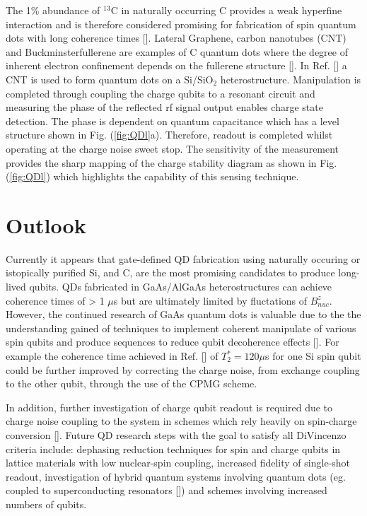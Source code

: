 The 1\% abundance of $^{13}$C in naturally occurring C provides a weak hyperfine interaction and is therefore considered promising for fabrication of spin quantum dots with long coherence times []. Lateral Graphene, carbon nanotubes (CNT) and Buckminsterfullerene are examples of C quantum dots where the degree of inherent electron confinement depends on the fullerene structure []. In Ref. [] a CNT is used to form quantum dots on a Si/SiO$_{2}$ heterostructure. Manipulation is completed through coupling the charge qubits to a resonant circuit and measuring the phase of the reflected rf signal output enables charge state detection. The phase is dependent on quantum capacitance which has a level structure shown in Fig. (\ref{fig:QDl}a). Therefore, readout is completed whilst operating at the charge noise sweet stop. The sensitivity of the measurement provides the sharp mapping of the charge stability diagram as shown in Fig. (\ref{fig:QDl}) which highlights the capability of this sensing technique.   



\section{Outlook}
Currently it appears that gate-defined QD fabrication using naturally occuring or istopically purified Si, and C, are the most promising candidates to produce long-lived qubits. QDs fabricated in GaAs/AlGaAs heterostructures can achieve coherence times of > 1 $\mu$s but are ultimately limited by fluctations of $B^{z}_{nuc}$. However, the continued research of GaAs quantum dots is valuable due to the the understanding gained of techniques to implement coherent manipulate of various spin qubits and produce sequences to reduce qubit decoherence effects []. For example the coherence time achieved in Ref. [] of $T_2^{*} =120 \mu$s for one Si spin qubit could be further improved by correcting the charge noise, from exchange coupling to the other qubit, through the use of the CPMG scheme. 

In addition, further investigation of charge qubit readout is required due to charge noise coupling to the system in schemes which rely heavily on spin-charge conversion []. Future QD research steps with the goal to satisfy all DiVincenzo criteria include: dephasing reduction techniques for spin and charge qubits in lattice materials with low nuclear-spin coupling, increased fidelity of single-shot readout, investigation of hybrid quantum systems involving quantum dots (eg. coupled to superconducting resonators []) and schemes involving increased numbers of qubits. 



 
 


